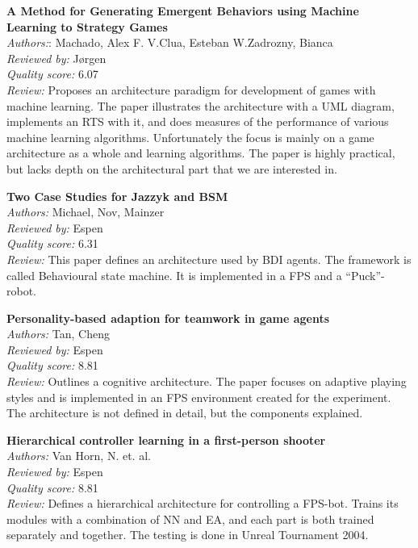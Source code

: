 \textbf{A Method for Generating Emergent Behaviors using Machine Learning to Strategy Games}\\
\textit{Authors:}: Machado, Alex F. V.Clua, Esteban W.Zadrozny, Bianca\\
\textit{Reviewed by:} Jørgen\\
\textit{Quality score:} 6.07\\
\textit{Review:} Proposes an architecture paradigm for development of games with machine learning. The paper illustrates the architecture with a UML diagram, implements an RTS with it, and does measures of the performance of various machine learning algorithms. Unfortunately the focus is mainly on a game architecture as a whole and learning algorithms. The paper is highly practical, but lacks depth on the architectural part that we are interested in.

\textbf{Two Case Studies for Jazzyk and BSM}\\
\textit{Authors:} Michael, Nov, Mainzer\\
\textit{Reviewed by:} Espen\\
\textit{Quality score:} 6.31\\
\textit{Review:} This paper defines an architecture used by BDI agents. The framework is called Behavioural state machine. It is implemented in a FPS and a “Puck”-robot.

\textbf{Personality-based adaption for teamwork in game agents}\\
\textit{Authors:} Tan, Cheng\\
\textit{Reviewed by:} Espen\\
\textit{Quality score:} 8.81\\
\textit{Review:} Outlines a cognitive architecture. The paper focuses on adaptive playing styles and is implemented in an FPS environment created for the experiment. The architecture is not defined in detail, but the components explained. 

\textbf{Hierarchical controller learning in a first-person shooter}\\
\textit{Authors:} Van Horn, N. et. al.\\
\textit{Reviewed by:} Espen\\
\textit{Quality score:} 8.81\\
\textit{Review:} Defines a hierarchical architecture for controlling a FPS-bot. Trains its modules with a combination of NN and EA, and each part is both trained separately and together. The testing is done in Unreal Tournament 2004. 

